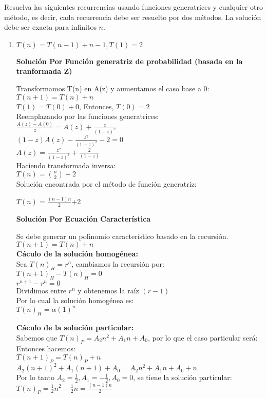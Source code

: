 \documentclass{article}
\begin{document}
Resuelva las siguientes recurrencias usando funciones generatrices y cualquier otro método, es decir, cada recurrencia debe ser resuelto por dos métodos. 
La solución debe ser exacta para infinitos $n$.

\begin{enumerate}[label=\textbf{\alph*.}]
  \item $T(n)=T(n-1)+n-1, T(1)=2$
  
  \textbf{Soluci\'on Por Funci\'on generatriz de probabilidad (basada en la tranformada Z)}
  
  Transformamos T(n) en A(z) y aumentamos el caso base a 0:\\
  $T(n+1)=T(n) + n$\\
  $T(1) = T(0) + 0$, Entonces, $T(0)=2$\\
  Reemplazando por las funciones generatrices:\\
  $\frac{A(z) - A(0)}{z} = A(z) + \frac{z}{(1-z)^2}$\\
  $(1-z)A(z) - \frac{z^2}{(1-z)^2} - 2=0$\\
  $A(z) = \frac{z^2}{(1-z)^3} + \frac{2}{(1-z)}$\\
  Haciendo transformada inversa:\\
  $T(n) = {n \choose 2} + 2$\\
  
  Soluci\'on encontrada por el m\'etodo de función generatriz:
  \begin{center}
    $T(n) = \frac{(n-1)n}{2}$+2
  \end{center}
    
  \textbf{Soluci\'on Por Ecuaci\'on Caracter\'istica}
  
  Se debe generar un polinomio caracter\'istico basado en la recursi\'on.\\
  $T(n+1)=T(n) + n$\\
  
  \textbf{C\'aculo de la soluci\'on homog\'enea:}\\
  Sea $ T(n)_H = r^n $, cambiamos la recursi\'on por:\\
  $T(n+1)_H - T(n)_H = 0$\\
  $r^{n+1} - r^{n} = 0$\\
  Dividimos entre $r^{n}$ y obtenemos la ra\'iz $(r-1)$\\
  Por lo cual la soluci\'on homog\'enea es:\\
  $T(n)_H = \alpha (1)^n$
  
  \textbf{C\'aculo de la soluci\'on particular:}\\
  Sabemos que $T(n)_P = A_2n^2 + A_1n + A_0$, por lo que el caso particular ser\'a:\\
  Entonces hacemos:\\
  $T(n+1)_P=T(n)_P + n$\\
  $A_2(n+1)^2+A_1(n+1)+A_0 = A_2 n^2 + A_1n + A_0 + n$\\
  Por lo tanto $A_2 =\frac{1}{2}, A_1=-\frac{1}{2}, A_0=0$, se tiene la soluci\'on particular:\\
  $T(n)_P =\frac{1}{2} n^2-\frac{1}{2}n = \frac{(n-1)n}{2}$
  

\end{enumerate}
\end{document}
